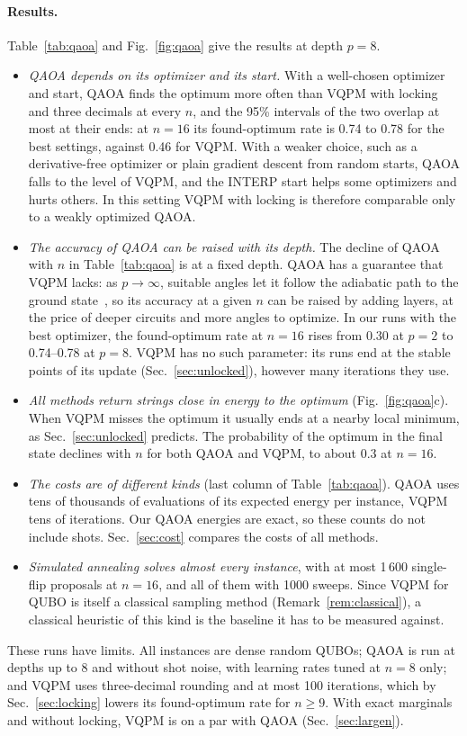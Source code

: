 \documentclass[onecolumn,10pt]{article}
\theoremstyle{remark}
\theoremstyle{plain}
\begin{document}
\paragraph{Results.} Table~\ref{tab:qaoa} and Fig.~\ref{fig:qaoa} give the results at depth $p=8$.
\begin{itemize}
\item \emph{QAOA depends on its optimizer and its start.} With a well-chosen optimizer and start, QAOA finds the optimum more often than VQPM with locking and three decimals at every $n$, and the 95\% intervals of the two overlap at most at their ends: at $n=16$ its found-optimum rate is 0.74 to 0.78 for the best settings, against 0.46 for VQPM. With a weaker choice, such as a derivative-free optimizer or plain gradient descent from random starts, QAOA falls to the level of VQPM, and the INTERP start helps some optimizers and hurts others. In this setting VQPM with locking is therefore comparable only to a weakly optimized QAOA.
\item \emph{The accuracy of QAOA can be raised with its depth.} The decline of QAOA with $n$ in Table~\ref{tab:qaoa} is at a fixed depth. QAOA has a guarantee that VQPM lacks: as $p\to\infty$, suitable angles let it follow the adiabatic path to the ground state~\cite{farhi2014quantum}, so its accuracy at a given $n$ can be raised by adding layers, at the price of deeper circuits and more angles to optimize. In our runs with the best optimizer, the found-optimum rate at $n=16$ rises from 0.30 at $p=2$ to 0.74--0.78 at $p=8$. VQPM has no such parameter: its runs end at the stable points of its update (Sec.~\ref{sec:unlocked}), however many iterations they use.
\item \emph{All methods return strings close in energy to the optimum} (Fig.~\ref{fig:qaoa}c). When VQPM misses the optimum it usually ends at a nearby local minimum, as Sec.~\ref{sec:unlocked} predicts. The probability of the optimum in the final state declines with $n$ for both QAOA and VQPM, to about 0.3 at $n=16$.
\item \emph{The costs are of different kinds} (last column of Table~\ref{tab:qaoa}). QAOA uses tens of thousands of evaluations of its expected energy per instance, VQPM tens of iterations. Our QAOA energies are exact, so these counts do not include shots. Sec.~\ref{sec:cost} compares the costs of all methods.
\item \emph{Simulated annealing solves almost every instance}, with at most 1\,600 single-flip proposals at $n=16$, and all of them with 1000 sweeps. Since VQPM for QUBO is itself a classical sampling method (Remark~\ref{rem:classical}), a classical heuristic of this kind is the baseline it has to be measured against.
\end{itemize}
These runs have limits. All instances are dense random QUBOs; QAOA is run at depths up to 8 and without shot noise, with learning rates tuned at $n=8$ only; and VQPM uses three-decimal rounding and at most 100 iterations, which by Sec.~\ref{sec:locking} lowers its found-optimum rate for $n\ge9$. With exact marginals and without locking, VQPM is on a par with QAOA (Sec.~\ref{sec:largen}).
\end{document}
